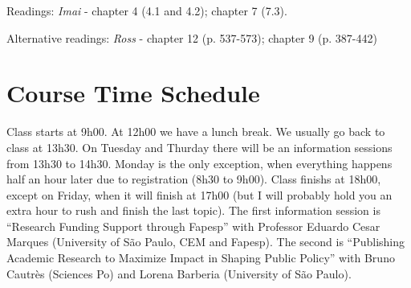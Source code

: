 \documentclass[a4paper,11pt]{article}
\begin{document}
Readings: \emph{Imai} - chapter 4 (4.1 and 4.2); chapter 7 (7.3).

Alternative readings: \emph{Ross} - chapter 12 (p. 537-573); chapter 9 (p. 387-442)

\section{Course Time Schedule}

Class starts at 9h00. At 12h00 we have a lunch break. We usually go back to class at 13h30. On Tuesday and Thurday there will be an information sessions from 13h30 to 14h30. Monday is the only exception, when everything happens half an hour later due to registration (8h30 to 9h00). Class finishs at 18h00, except on Friday, when it will finish at 17h00 (but I will probably hold you an extra hour to rush and finish the last topic). The first information session is ``Research Funding Support through Fapesp'' with Professor Eduardo Cesar Marques (University of São Paulo, CEM and Fapesp). The second is ``Publishing Academic Research to Maximize Impact in Shaping Public Policy'' with  Bruno Cautrès (Sciences Po) and Lorena Barberia (University of São Paulo).
\end{document}
